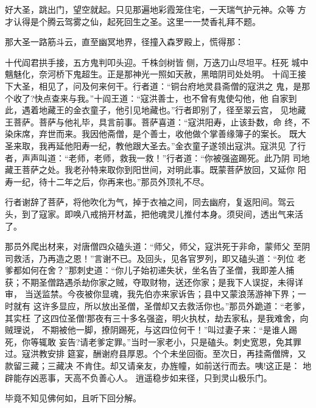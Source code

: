 好大圣，跳出门，望空就起。只见那遍地彩霞笼住宅，一天瑞气护元神。众等
方才认得是个腾云驾雾之仙，起死回生之圣。这里一一焚香礼拜不题。

那大圣一路筋斗云，直至幽冥地界，径撞入森罗殿上，慌得那：

十代阎君拱手接，五方鬼判叩头迎。千株剑树皆侧，万迭刀山尽坦平。枉死
城中魑魅化，奈河桥下鬼超生。正是那神光一照如天赦，黑暗阴司处处明。
十阎王接下大圣，相见了，问及何来何干。行者道：“铜台府地灵县斋僧的寇洪之
鬼，是那个收了?快点查来与我。”十阎王道：“寇洪善士，也不曾有鬼使勾他，他
自家到此，遇着地藏王的金衣童子，他引见地藏也。”行者即别了，径至翠云宫，
见地藏王菩萨。菩萨与他礼毕，具言前事。菩萨喜道：“寇洪阳寿，止该卦数，命
终，不染床席，弃世而来。我因他斋僧，是个善士，收他做个掌善缘簿子的案长。
既大圣来取，我再延他阳寿一纪，教他跟大圣去。”金衣童子遂领出寇洪。寇洪见
了行者，声声叫道：“老师，老师，救我一救！”行者道：“你被强盗踢死。此乃阴
司地藏王菩萨之处。我老孙特来取你到阳世间，对明此事。既蒙菩萨放回，又延你
阳寿一纪，待十二年之后，你再来也。”那员外顶礼不尽。

行者谢辞了菩萨，将他吹化为气，掉于衣袖之间，同去幽府，复返阳间。驾云
头，到了寇家。即唤八戒捎开材盖，把他魂灵儿推付本身。须臾间，透出气来活了。

那员外爬出材来，对唐僧四众磕头道：“师父，师父，寇洪死于非命，蒙师父
至阴司救活，乃再造之恩！”言谢不已。及回头，见各官罗列，即又磕头道：“列位
老爹都如何在舍？”那刺史道：“你儿子始初递失状，坐名告了圣僧，我即差人捕
获；不期圣僧路遇杀劫你家之贼，夺取财物，送还你家；是我下人误捉，未得详审，
当送监禁。今夜被你显魂，我先伯亦来家诉告；县中又蒙浪荡游神下界；一时就有
这许多显应，所以放出圣僧，圣僧却又去救活你也。”那员外跪道：“老爹，其实枉
了这四位圣僧!那夜有三十多名强盗，明火执杖，劫去家私，是我难舍，向贼理说，
不期被他一脚，撩阴踢死，与这四位何干！”叫过妻子来：“是谁人踢死，你等辄敢
妄告?请老爹定罪。”当时一家老小，只是磕头。刺史宽恩，免其罪过。寇洪教安排
筵宴，酬谢府县厚恩。个个未坐回衙。至次日，再挂斋僧牌，又款留三藏；三藏决
不肯住。却又请亲友，办旌幢，如前送行而去。咦!这正是：
地辟能存凶恶事，天高不负善心人。
逍遥稳步如来径，只到灵山极乐门。

毕竟不知见佛何如，且听下回分解。